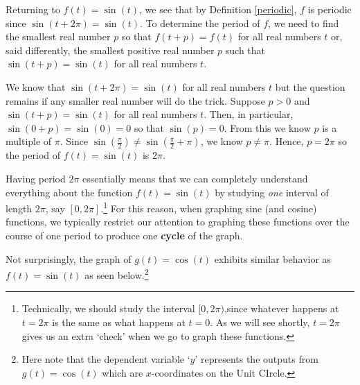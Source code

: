 \smallskip

Returning to $f(t) = \sin(t)$, we see that by Definition \ref{periodic}, $f$ is periodic since $\sin(t + 2\pi) = \sin(t)$.  To determine the period of $f$, we need to find the smallest real number $p$ so that $f(t+p) = f(t)$ for all real numbers $t$ or, said differently, the smallest positive real number $p$ such that $\sin(t+p) = \sin(t)$  for all real numbers $t$.  

\smallskip

We know that $\sin(t + 2\pi) = \sin(t)$ for all real numbers $t$ but the question remains if any smaller real number will do the trick.  Suppose $p>0$ and $\sin(t + p) = \sin(t)$ for all real numbers $t$.  Then, in particular, $\sin(0+p) = \sin(0)=0$ so that $\sin(p) = 0$.  From this we know $p$ is a multiple of $\pi$.  Since $\sin\left(\frac{\pi}{2} \right)  \neq \sin\left(\frac{\pi}{2} + \pi \right) $, we know $p \neq \pi$.  Hence, $p  = 2\pi$ so the period of $f(t) = \sin(t)$ is $2\pi$. 

\smallskip

Having period $2\pi$ essentially means that we can completely understand everything about the function  $f(t) =  \sin(t)$ by studying \textit{one} interval of length $2\pi$, say $[0,2\pi]$.\footnote{Technically, we should study the interval $[0,2\pi)$,\footnotemark since whatever happens at $t=2\pi$ is the same as what happens at $t=0$.  As we will see shortly, $t=2\pi$ gives us an extra `check' when we go to graph these functions.} \footnotetext{In some advanced texts, the interval of choice is $[-\pi, \pi)$.}  For this reason, when graphing sine (and cosine) functions, we typically restrict our attention to graphing these functions over the course of one period to produce one \textbf{cycle} of the graph. 
 
\smallskip


Not surprisingly, the graph of $g(t) = \cos(t)$ exhibits similar behavior as $f(t) = \sin(t)$ as seen below.\footnote{Here note that the dependent variable `$y$' represents the outputs from  $g(t) = \cos(t)$ which are $x$-coordinates on the Unit CIrcle.}  

